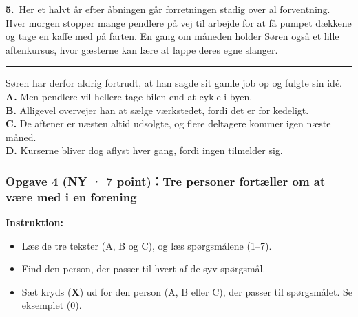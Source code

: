 \begin{tcolorbox}[enhanced, breakable, colback=NCDBgGray, colframe=NCDNavy!60, boxrule=0.7pt, arc=2pt, left=9pt, right=9pt, top=6pt, bottom=6pt]
\textbf{\color{NCDNavy}5.}\ Her et halvt år efter åbningen går forretningen stadig over al forventning. Hver morgen stopper mange pendlere på vej til arbejde for at få pumpet dækkene og tage en kaffe med på farten. En gang om måneden holder Søren også et lille aftenkursus, hvor gæsterne kan lære at lappe deres egne slanger. \rule{2.3cm}{0.4pt} Søren har derfor aldrig fortrudt, at han sagde sit gamle job op og fulgte sin idé.\\[4pt]
\textbf{A.} Men pendlere vil hellere tage bilen end at cykle i byen.\\
\textbf{B.} Alligevel overvejer han at sælge værkstedet, fordi det er for kedeligt.\\
\textbf{C.} De aftener er næsten altid udsolgte, og flere deltagere kommer igen næste måned.\\
\textbf{D.} Kurserne bliver dog aflyst hver gang, fordi ingen tilmelder sig.
\end{tcolorbox}

\subsubsection*{Opgave 4 (NY · 7 point)：Tre personer fortæller om at være med i en forening}

\textbf{Instruktion:}
\begin{itemize}
  \item Læs de tre tekster (A, B og C), og læs spørgsmålene (1--7).
  \item Find den person, der passer til hvert af de syv spørgsmål.
  \item Sæt kryds (\textbf{X}) ud for den person (A, B eller C), der passer til spørgsmålet. Se eksemplet (0).
\end{itemize}

